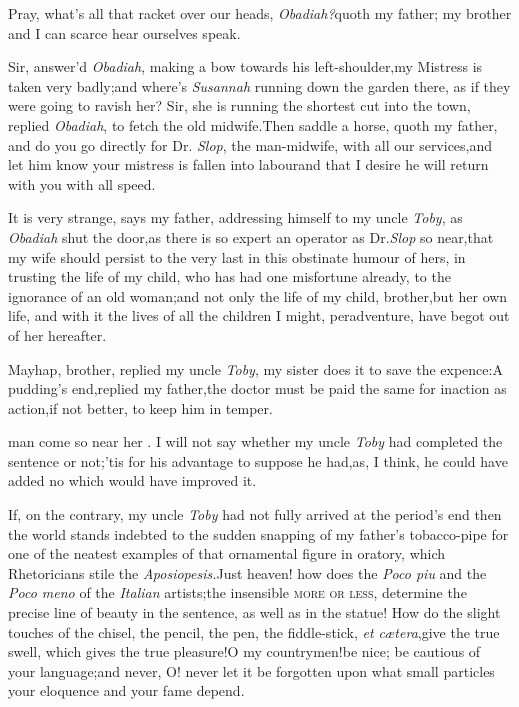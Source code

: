 \documentclass{article}
\begin{document}
Pray, what’s all that racket over our heads,
\textit{Obadiah?}\tsk quoth my father;\tsk\break
my brother and I can scarce hear ourselves speak.

Sir, answer’d \textit{Obadiah}, making a bow
towards his left-shoulder,\tsk my Mistress
is taken very badly;\tsk and where’s \textit{Susannah}
running down the garden there,
as if they were going to ravish her?\tsh\break
Sir, she is running the shortest cut into the town, replied
\textit{Obadiah}, to fetch the old midwife.\tsh Then saddle a
horse, quoth my father, and do you go directly for Dr.\@
\textit{Slop}, the man-midwife, with all our services,\tsk and
let him know your mistress is fallen into labour\tsk and that I
desire he will return with you with all speed.

It is very strange, says my father, addressing himself to my
uncle \textit{Toby}, as \textit{Obadiah} shut the door,\tsh as
there is so expert an operator as Dr.\@ \textit{Slop} so
near,\tsk\break that my wife should persist to the very last in
this obstinate humour of hers, in trusting the life of my child,
who has had one misfortune already, to the ignorance of an old
woman;\tsh and not only the life of my child, brother,\tsh but
her own life, and with it the lives of all the children I might,
peradventure, have begot out of her hereafter.

Mayhap, brother, replied my uncle\break
\textit{Toby}, my sister does it to save the expence:\tsk A
pudding’s end,\tsk replied my father,\tsh the doctor must be
paid the same for inaction as action,\tsk if not better,\tsk
to keep him in temper.

\noindent
{}
man come so near her \astiv. I will
not say whether my uncle \textit{Toby} had completed the
sentence or not;\tsh ’tis for his advantage to suppose he
had,\tsh\break as, I think, he could have added no
 which would have improved it.

If, on the contrary, my uncle \textit{Toby} had not fully arrived
at the period’s end\tsk\break
then the world stands indebted to
the sudden snapping of my father’s tobacco-pipe for one of
the neatest examples of that ornamental figure in oratory, which
Rhetoricians stile the \textit{Aposiopesis.}\tsh Just
heaven! how does the \textit{Poco piu} and the \textit{Poco meno} of
the \textit{Italian} artists;\tsk the insensible \textsc{more or
less}, determine the precise line of beauty in the sentence,
as well as in the statue! How do the slight touches of the chisel,
the pencil, the pen, the fiddle-stick, \textit{et
cætera},\tsk give the true swell, which gives the true
pleasure!\tsk O my countrymen!\tsk be nice; be cautious of your
language;\tsh and never, O! never let it be forgotten upon
what small
particles your eloquence and your fame depend.
\end{document}

